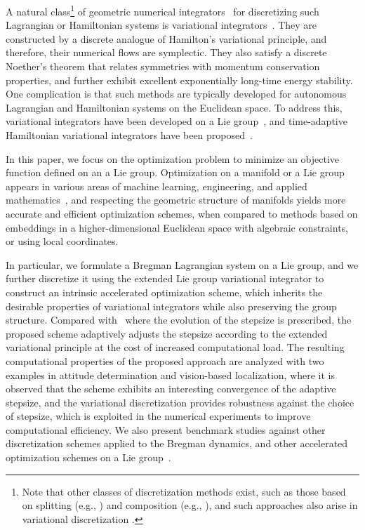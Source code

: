 \documentclass[letterpaper, 10pt, conference]{ieeeconf}
\begin{document}
A natural class\footnote{Note that other classes of discretization methods exist, such as those based on splitting (e.g., \cite{HaLuWa2006,tao2020variational}) and composition (e.g., \cite{tao2010nonintrusive}), and such approaches also arise in variational discretization \cite{MarWesAN01}.} 
of geometric numerical integrators~\cite{HaLuWa2006} for discretizing such Lagrangian or Hamiltonian systems is variational integrators~\cite{MarWesAN01,LeZh2009}.
They are constructed by a discrete analogue of Hamilton's variational principle, and therefore, their numerical flows are symplectic.
They also satisfy a discrete Noether's theorem that relates symmetries with momentum conservation properties, and further exhibit excellent exponentially long-time energy stability.
One complication is that such methods are typically developed for autonomous Lagrangian and Hamiltonian systems on the Euclidean space. 
To address this, variational integrators have been developed on a Lie group~\cite{LeeLeoCMAME07}, and time-adaptive Hamiltonian variational integrators have been proposed~\cite{DuScLe2021}.

In this paper, we focus on the optimization problem to minimize an objective function defined on an a Lie group. Optimization on a manifold or a Lie group appears in various areas of machine learning, engineering, and applied mathematics~\cite{hu2020brief,absil2009optimization}, and respecting the geometric structure of manifolds yields more accurate and efficient optimization schemes, when compared to methods based on embeddings in a higher-dimensional Euclidean space with algebraic constraints, or using local coordinates. 

In particular, we formulate a Bregman Lagrangian system on a Lie group, and we further discretize it using the extended Lie group variational integrator to construct an intrinsic accelerated optimization scheme, which inherits the desirable properties of variational integrators while also preserving the group structure. 
Compared with~\cite{DuScLe2021} where the evolution of the stepsize is prescribed, the proposed scheme adaptively adjusts the stepsize according to the extended variational principle at the cost of increased computational load. 
The resulting computational properties of the proposed approach are analyzed with two examples in attitude determination and vision-based localization,
where it is observed that the scheme exhibits an interesting convergence of the adaptive stepsize, and the variational discretization provides robustness against the choice of stepsize, which is exploited in the numerical experiments to improve computational efficiency. 
We also present benchmark studies against other discretization schemes applied to the Bregman dynamics, and other accelerated optimization schemes on a Lie group~\cite{tao2020variational}.
\end{document}
